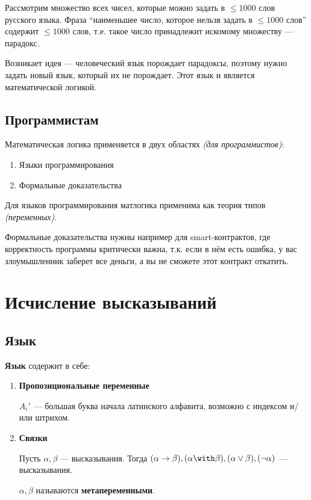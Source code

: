 \begin{example}
    Рассмотрим множество всех чисел, которые можно задать в \(\leq 1000\) слов русского языка. Фраза ``наименьшее число, которое нельзя задать в \( \leq 1000\) слов'' содержит \( \leq 1000\) слов, т.е. такое число принадлежит искомому множеству --- парадокс.
\end{example}

Возникает идея --- человеческий язык порождает парадоксы, поэтому нужно задать новый язык, который их не порождает. Этот язык и является математической логикой.

\subsection{Программистам}

Математическая логика применяется в двух областях \textit{(для программистов)}:
\begin{enumerate}
    \item Языки программирования
    \item Формальные доказательства
\end{enumerate}

Для языков программирования матлогика применима как теория типов \textit{(переменных)}.

Формальные доказательства нужны например для smart-контрактов, где корректность программы критически важна, т.к. если в нём есть ошибка, у вас злоумышленник заберет все деньги, а вы не сможете этот контракт откатить.

\section{Исчисление высказываний}

\subsection{Язык}

\begin{definition}\itemfix
    \textbf{Язык} содержит в себе:
    \begin{enumerate}
        \item \textbf{Пропозициональные переменные}

              \(A_i'\) --- большая буква начала латинского алфавита, возможно с индексом и/или штрихом.

        \item \textbf{Связки}

              Пусть \(\alpha, \beta\) --- высказывания. Тогда \((\alpha \to \beta), (\alpha \with \beta), (\alpha \lor \beta), (\neg \alpha)\) --- высказывания.

              \(\alpha,\beta\) называются \textbf{метапеременными}.
    \end{enumerate}
\end{definition}

